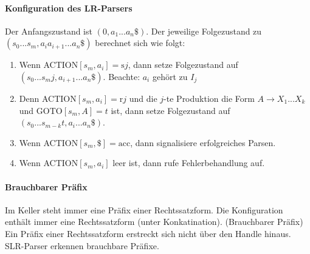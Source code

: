 \paragraph*{Konfiguration des LR-Parsers}
Der Anfangszustand ist $(0, a_1...a_n\$)$. Der jeweilige Folgezustand zu$(s_0...s_m, a_ia_{i+1}...a_n\$)$  berechnet sich wie folgt:
\begin{enumerate}
 \item Wenn ACTION$[s_m,a_i] = \text{s}j$, dann setze Folgezustand auf $(s_0...s_mj, a_{i+1}...a_n\$)$. Beachte: $a_i$ gehört zu $I_j$
 \item Denn ACTION$[s_m,a_i] = \text{r}j$ und die $j$-te Produktion die Form $A \to X_1 ... X_k$ und GOTO$[s_m, A] = t$ ist, dann setze Folgezustand auf $(s_0...s_{m-k}t, a_i...a_n\$)$.
 \item Wenn ACTION$[s_m,\$] = \text{acc}$, dann signalisiere erfolgreiches Parsen.
 \item Wenn ACTION$[s_m,a_i]$ leer ist, dann rufe Fehlerbehandlung auf.
\end{enumerate}

\paragraph*{Brauchbarer Präfix}
Im Keller steht immer eine Präfix einer Rechtssatzform. Die Konfiguration enthält immer eine Rechtssatzform (unter Konkatination).
\Defi (Brauchbarer Präfix) Ein Präfix einer Rechtssatzform erstreckt sich nicht über den Handle hinaus.
\Lemma SLR-Parser erkennen brauchbare Präfixe.